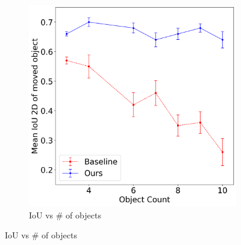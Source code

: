 

%
\begin{figure}
\begin{subfigure}{0.5\hsize}
     \centering    
     \includegraphics[scale=0.19]{figures/multi-object.png}
    \caption{\footnotesize{IoU vs \# of objects}}
    \label{fig:large_scenes}
\end{subfigure}%

\end{figure}
